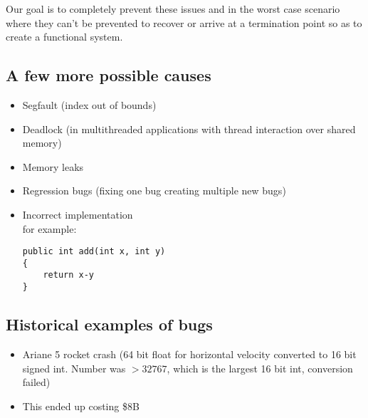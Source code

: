 \documentclass[12pt]{book}
\begin{document}
Our goal is to completely prevent these issues and in the worst case scenario where they can't be prevented to recover or arrive at a termination point so as to create a functional system.

\subsection*{A few more possible causes}
\begin{itemize}
  \item Segfault (index out of bounds)
  \item Deadlock (in multithreaded applications with thread interaction over shared memory)
  \item Memory leaks
  \item Regression bugs (fixing one bug creating multiple new bugs)
  \item Incorrect implementation\\for example:
\begin{lstlisting}
public int add(int x, int y)
{
    return x-y
}
\end{lstlisting}
\end{itemize}

\subsection*{Historical examples of bugs}

\begin{itemize}
  \item Ariane 5 rocket crash (64 bit float for horizontal velocity converted to 16 bit signed int. Number was $>32767$, which is the largest 16 bit int, conversion failed)
  \item This ended up costing \$8B
\end{itemize}
\end{document}
